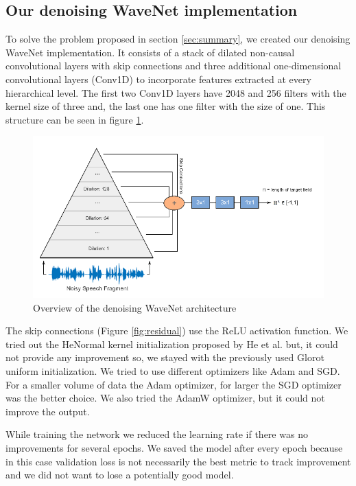 \documentclass{article}
\begin{document}
	\subsection{Our denoising WaveNet implementation}
	\label{sec:own_wavenet}
	To solve the problem proposed in section \ref{sec:summary}, we created our denoising WaveNet implementation. It consists of a stack of dilated non-causal convolutional layers with skip connections and three additional one-dimensional convolutional layers (Conv1D) to incorporate features extracted at every hierarchical level. The first two Conv1D layers have 2048 and 256 filters with the kernel size of three and, the last one has one filter with the size of one. This structure can be seen in figure \ref{fig:own_wavenet}.
	\begin{figure}[htbp]
		\centering
		\includegraphics[width=1\linewidth]{own_wavenet.png}
		\caption{Overview of the denoising WaveNet architecture}
		\label{fig:own_wavenet}
	\end{figure}
	The skip connections (Figure \ref{fig:residual}) use the ReLU activation function. We tried out the HeNormal kernel initialization proposed by He et al. \cite{he2015delving} but, it could not provide any improvement so, we stayed with the previously used Glorot uniform initialization.
	We tried to use different optimizers like Adam and SGD. For a smaller volume of data the Adam optimizer, for larger the SGD optimizer was the better choice. We also tried the AdamW\cite{adamw} optimizer, but it could not improve the output. 

	While training the network we reduced the learning rate if there was no improvements for several epochs. We saved the model after every epoch because in this case validation loss is not necessarily the best metric to track improvement and we did not want to lose a potentially good model.
\end{document}
